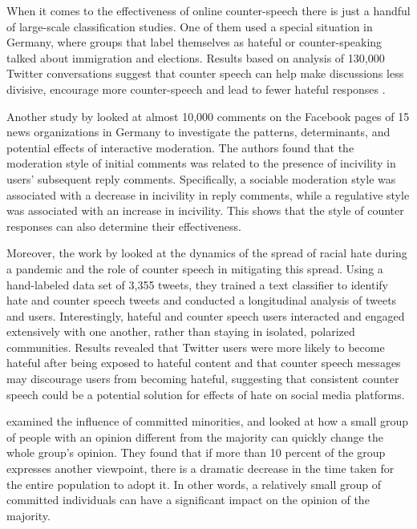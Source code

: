 \documentclass[preprint,12pt]{elsarticle}
\begin{document}
When it comes to the effectiveness of online counter-speech there is just a handful of large-scale classification studies. One of them used a special situation in Germany, where groups that label themselves as hateful or counter-speaking talked about immigration and elections. Results based on analysis of 130,000 Twitter conversations suggest that counter speech can help make discussions less divisive, encourage more counter-speech and lead to fewer hateful responses \citep{garland2020countering}. 

Another study by \citet{ziegele2018journalistic} looked at almost 10,000 comments on the Facebook pages of 15 news organizations in Germany to investigate the patterns, determinants, and potential effects of interactive moderation. The authors found that the moderation style of initial comments was related to the presence of incivility in users' subsequent reply comments. Specifically, a sociable moderation style was associated with a decrease in incivility in reply comments, while a regulative style was associated with an increase in incivility. This shows that the style of counter responses can also determine their effectiveness. 

Moreover, the work by \citet{ziems2020racism} looked at the dynamics of the spread of racial hate during a pandemic and the role of counter speech in mitigating this spread. Using a hand-labeled data set of 3,355 tweets, they trained a text classifier to identify hate and counter speech tweets and conducted a longitudinal analysis of tweets and users. Interestingly, hateful and counter speech users interacted and engaged extensively with one another, rather than staying in isolated, polarized communities. Results revealed that Twitter users were more likely to become hateful after being exposed to hateful content and that counter speech messages may discourage users from becoming hateful, suggesting that consistent counter speech could be a potential solution for effects of hate on social media platforms. 

 \citep{xie2011social} examined the influence of committed minorities, and looked at how a small group of people with an opinion different from the majority can quickly change the whole group's opinion. They found that if more than 10 percent of the group expresses another viewpoint, there is a dramatic decrease in the time taken for the entire population to adopt it. In other words, a relatively small group of committed individuals can have a significant impact on the opinion of the majority. 
\end{document}
